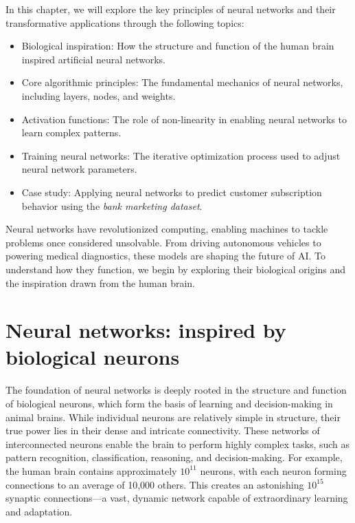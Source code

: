 \documentclass[
  11pt,
]{book}
\providecommand{\tightlist}{%
  \setlength{\itemsep}{0pt}\setlength{\parskip}{0pt}}
\theoremstyle{definition}
\theoremstyle{definition}
\theoremstyle{definition}
\theoremstyle{definition}
\theoremstyle{remark}
\begin{document}
In this chapter, we will explore the key principles of neural networks and their transformative applications through the following topics:

\begin{itemize}
\tightlist
\item
  Biological inspiration: How the structure and function of the human brain inspired artificial neural networks.\\
\item
  Core algorithmic principles: The fundamental mechanics of neural networks, including layers, nodes, and weights.\\
\item
  Activation functions: The role of non-linearity in enabling neural networks to learn complex patterns.\\
\item
  Training neural networks: The iterative optimization process used to adjust neural network parameters.\\
\item
  Case study: Applying neural networks to predict customer subscription behavior using the \emph{bank marketing dataset}.
\end{itemize}

Neural networks have revolutionized computing, enabling machines to tackle problems once considered unsolvable. From driving autonomous vehicles to powering medical diagnostics, these models are shaping the future of AI. To understand how they function, we begin by exploring their biological origins and the inspiration drawn from the human brain.

\section{Neural networks: inspired by biological neurons}\label{neural-networks-inspired-by-biological-neurons}

The foundation of neural networks is deeply rooted in the structure and function of biological neurons, which form the basis of learning and decision-making in animal brains. While individual neurons are relatively simple in structure, their true power lies in their dense and intricate connectivity. These networks of interconnected neurons enable the brain to perform highly complex tasks, such as pattern recognition, classification, reasoning, and decision-making. For example, the human brain contains approximately \(10^{11}\) neurons, with each neuron forming connections to an average of 10,000 others. This creates an astonishing \(10^{15}\) synaptic connections---a vast, dynamic network capable of extraordinary learning and adaptation.
\end{document}
